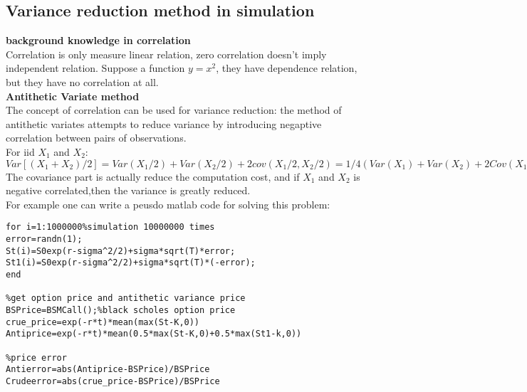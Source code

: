 \documentclass[a4paper,11pt]{article}
\begin{document}
\subsection{Variance reduction method in simulation}
{\bf background knowledge in correlation}\\
Correlation is only measure linear relation, zero correlation doesn't imply independent relation. Suppose a function $y=x^2$, they have dependence relation, but they have no correlation at all.\\
{\bf Antithetic Variate method}\\
The concept of correlation can be  used for variance reduction: the method of antithetic variates attempts to reduce variance by introducing negaptive correlation between pairs of observations.\\ For iid $X_1$ and $X_2$: $Var[(X_1+X_2)/2]=Var(X_1/2)+Var(X_2/2)+2cov(X_1/2,X_2/2)=1/4(Var(X_1)+Var(X_2)+2Cov(X_1,X_2))$ The covariance part is actually reduce the computation cost, and if $X_1$  and $X_2$ is negative correlated,then the variance is greatly reduced.\\
For example one can write a peusdo matlab code for solving this problem:\\
\begin{verbatim}
for i=1:1000000%simulation 10000000 times
error=randn(1);
St(i)=S0exp(r-sigma^2/2)+sigma*sqrt(T)*error;
St1(i)=S0exp(r-sigma^2/2)+sigma*sqrt(T)*(-error);
end

%get option price and antithetic variance price
BSPrice=BSMCall();%black scholes option price
crue_price=exp(-r*t)*mean(max(St-K,0))
Antiprice=exp(-r*t)*mean(0.5*max(St-K,0)+0.5*max(St1-k,0))

%price error
Antierror=abs(Antiprice-BSPrice)/BSPrice
Crudeerror=abs(crue_price-BSPrice)/BSPrice
\end{verbatim}
\end{document}
